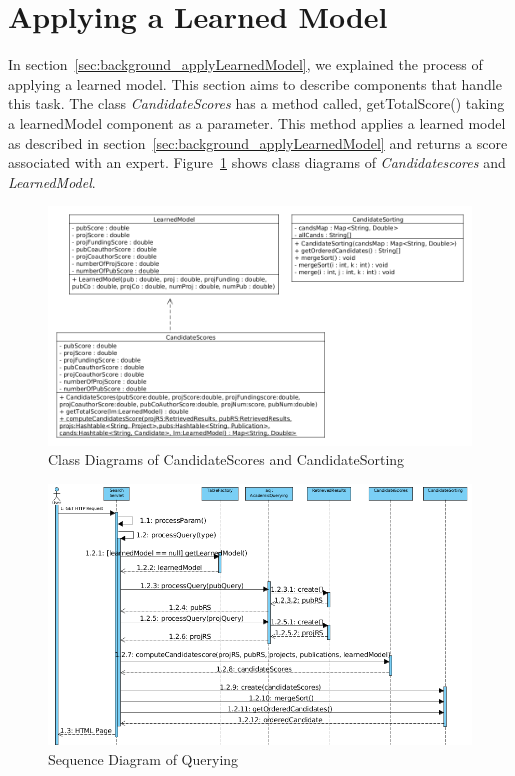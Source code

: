 \section{Applying a Learned Model}\label{section:applyinglearnedmodel}
In section~\ref{sec:background_applyLearnedModel}, we explained the process of applying a learned model. This section aims to describe components
that handle this task. The class \textit{CandidateScores} has a method called, getTotalScore() taking a learnedModel component as a parameter. 
This method applies a learned model as described in section~\ref{sec:background_applyLearnedModel} and returns a score associated with an expert.
Figure~\ref{fig:scoreandsorting} shows class diagrams of \textit{Candidatescores} and \textit{LearnedModel}.

\begin{figure}
\centering
\includegraphics[scale=0.5]{./figures/score&sorting.png}
\caption{Class Diagrams of CandidateScores and CandidateSorting} \label{fig:scoreandsorting} 
\end{figure}

\begin{figure}
\centering
\includegraphics[scale=0.5]{./figures/searchsequence.png}
\caption{Sequence Diagram of Querying} \label{fig:searchsequence} 
\end{figure}

